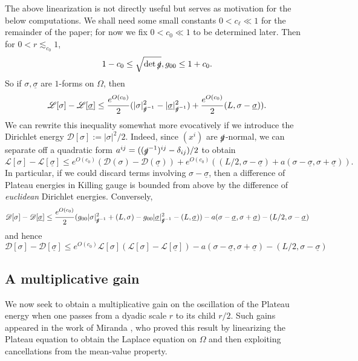 \documentclass[reqno,12pt,letterpaper]{amsart}
\newcommand{\Lagrange}{\mathscr L}
\newcommand{\DirL}{\mathscr D}
\theoremstyle{definition}
\numberwithin{equation}{section}
\begin{document}
The above linearization is not directly useful but serves as motivation for the below computations.
We shall need some small constants $0 < c_\ell \ll 1$ for the remainder of the paper; for now we fix $0 < c_0 \ll 1$ to be determined later. Then for $0 < r \lesssim_{c_0} 1$,
$$1 - c_0 \leq \sqrt{\det \slashed g}, g_{00} \leq 1 + c_0.$$
So if $\sigma, \underline \sigma$ are $1$-forms on $\Omega$, then
$$\Lagrange[\sigma] - \Lagrange[\underline \sigma] \leq \frac{e^{O(c_0)}}{2}(|\sigma|_{\slashed g^{-1}}^2 - |\underline \sigma|_{\slashed g^{-1}}^2) + \frac{e^{O(c_0)}}{2}(L, \sigma - \underline \sigma)).$$
We can rewrite this inequality somewhat more evocatively if we introduce the Dirichlet energy $\DirL[\sigma] := |\sigma|^2/2$.
Indeed, since $(x^i)$ are $\slashed g$-normal, we can separate off a quadratic form $a^{ij} = ((\slashed g^{-1})^{ij} - \delta_{ij})/2$ to obtain
\begin{equation}\label{Plateau and Dirichlet 1}
\Lagrange[\sigma] - \Lagrange[\underline \sigma] \leq e^{O(c_0)} (\DirL(\sigma) - \DirL(\underline \sigma)) + e^{O(c_0)} ((L/2, \sigma - \underline \sigma) + a(\sigma - \underline \sigma, \sigma + \underline \sigma)).
\end{equation}
In particular, if we could discard terms involving $\sigma - \underline \sigma$, then a difference of Plateau energies in Killing gauge is bounded from above by the difference of \emph{euclidean} Dirichlet energies.
Conversely, 
\begin{align*}
\DirL[\sigma] - \DirL[\underline \sigma] \leq \frac{e^{O(c_0)}}{2}(g_{00} |\sigma|_{\slashed g^{-1}}^2 + (L, \sigma) - g_{00} |\underline \sigma|_{\slashed g^{-1}}^2 - (L, \underline \sigma)) - a(\sigma - \underline \sigma, \sigma + \underline \sigma) - (L/2, \sigma - \underline \sigma)
\end{align*}
and hence 
\begin{equation}\label{Plateau and Dirichlet 2}
\DirL[\sigma] - \DirL[\underline \sigma] \leq e^{O(c_0)} \Lagrange[\sigma] (\Lagrange[\sigma] - \Lagrange[\underline \sigma]) - a(\sigma - \underline \sigma, \sigma + \underline \sigma) - (L/2, \sigma - \underline \sigma)
\end{equation}

\subsection{A multiplicative gain}
We now seek to obtain a multiplicative gain on the oscillation of the Plateau energy when one passes from a dyadic scale $r$ to its child $r/2$.
Such gains appeared in the work of Miranda \cite[Teorema 4.3]{Miranda66}, who proved this result by linearizing the Plateau equation to obtain the Laplace equation on $\Omega$ and then exploiting cancellations from the mean-value property.
\end{document}
